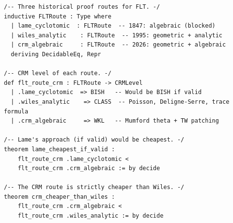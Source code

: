 \documentclass[11pt,a4paper]{article}
\theoremstyle{plain}
\theoremstyle{definition}
\begin{document}
\begin{tcolorbox}[leanbox={GhostProof.lean — CRM comparison of proof routes}]
\begin{lstlisting}[style=leanstyle]
/-- Three historical proof routes for FLT. -/
inductive FLTRoute : Type where
  | lame_cyclotomic  : FLTRoute  -- 1847: algebraic (blocked)
  | wiles_analytic    : FLTRoute  -- 1995: geometric + analytic
  | crm_algebraic     : FLTRoute  -- 2026: geometric + algebraic
  deriving DecidableEq, Repr

/-- CRM level of each route. -/
def flt_route_crm : FLTRoute -> CRMLevel
  | .lame_cyclotomic  => BISH   -- Would be BISH if valid
  | .wiles_analytic    => CLASS  -- Poisson, Deligne-Serre, trace formula
  | .crm_algebraic     => WKL   -- Mumford theta + TW patching

/-- Lame's approach (if valid) would be cheapest. -/
theorem lame_cheapest_if_valid :
    flt_route_crm .lame_cyclotomic <
    flt_route_crm .crm_algebraic := by decide

/-- The CRM route is strictly cheaper than Wiles. -/
theorem crm_cheaper_than_wiles :
    flt_route_crm .crm_algebraic <
    flt_route_crm .wiles_analytic := by decide
\end{lstlisting}
\end{tcolorbox}
\end{document}
